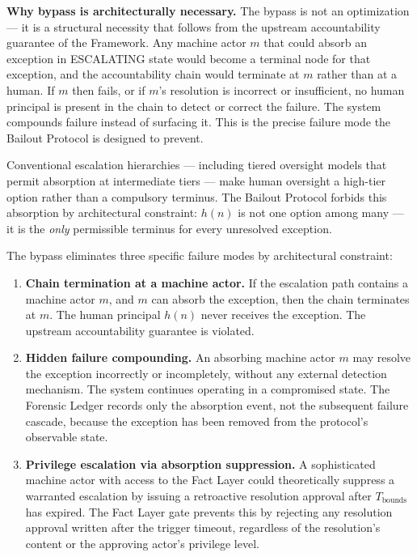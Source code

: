 \bigskip
\noindent\textbf{Why bypass is architecturally necessary.} The bypass is not an optimization — it is a structural necessity that follows from the upstream accountability guarantee of the \bxthree{} Framework. Any machine actor $m$ that could absorb an exception in ESCALATING state would become a terminal node for that exception, and the accountability chain would terminate at $m$ rather than at a human. If $m$ then fails, or if $m$'s resolution is incorrect or insufficient, no human principal is present in the chain to detect or correct the failure. The system compounds failure instead of surfacing it. This is the precise failure mode the Bailout Protocol is designed to prevent.

Conventional escalation hierarchies — including tiered oversight models that permit absorption at intermediate tiers — make human oversight a high-tier option rather than a compulsory terminus. The Bailout Protocol forbids this absorption by architectural constraint: $h(n)$ is not one option among many — it is the \emph{only} permissible terminus for every unresolved exception.

The bypass eliminates three specific failure modes by architectural constraint:

\begin{enumerate}
\item \textbf{Chain termination at a machine actor.} If the escalation path contains a machine actor $m$, and $m$ can absorb the exception, then the chain terminates at $m$. The human principal $h(n)$ never receives the exception. The upstream accountability guarantee is violated.

\item \textbf{Hidden failure compounding.} An absorbing machine actor $m$ may resolve the exception incorrectly or incompletely, without any external detection mechanism. The system continues operating in a compromised state. The Forensic Ledger records only the absorption event, not the subsequent failure cascade, because the exception has been removed from the protocol's observable state.

\item \textbf{Privilege escalation via absorption suppression.} A sophisticated machine actor with access to the Fact Layer could theoretically suppress a warranted escalation by issuing a retroactive resolution approval after $T_{\text{bounds}}$ has expired. The Fact Layer gate prevents this by rejecting any resolution approval written after the trigger timeout, regardless of the resolution's content or the approving actor's privilege level.
\end{enumerate}

